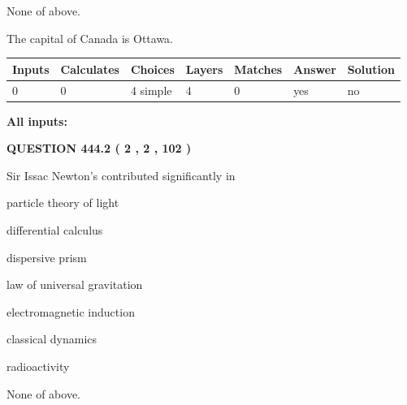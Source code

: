 \documentclass[12pt]{article}
\begin{document}
 
 None of above.
 
 
\noindent{}
 
 
The capital of Canada is Ottawa.
 
 
\noindent{}
 
 
   
   
   
   
\noindent\begin{tabular}{|l|l|l|l|l|l|l|}
 \hline
Inputs & Calculates & Choices & Layers & Matches & Answer & Solution \\ \hline
 0  & 
 0  & 
 4
  simple  
  & 
 4  & 
 0  & 
  yes & 
  no 
  \\ \hline
 \end{tabular}
   
   
   
   
\noindent{}
   
   
   
   
\noindent\vspace{0.1in}\hspace{-0.08in} {\textbf{\Large{All inputs: }}}
   
   
  
\vspace{0.2in}
  
{\textbf{\Large{QUESTION
444.2 
 ( 2 , 2 , 102 )
}}}
  
  
Sir Issac Newton's contributed significantly in
 
 
particle theory of light
 
 
differential calculus
 
 
dispersive prism
 
 
law of universal gravitation
 
 
electromagnetic induction
 
 
classical dynamics
 
 
radioactivity
 
 
 None of above.
 
\end{document}
